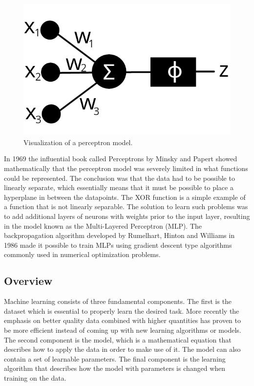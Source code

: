 \begin{figure}[H]
    \centering
    \includegraphics[width=0.8\linewidth]{Figures/Misc/Perceptron.png}
    \caption{Visualization of a perceptron model.}
    \label{fig:perceptron}
\end{figure}

In 1969 the influential book called Perceptrons by Minsky and Papert\cite{perceptronsbook} showed mathematically that the perceptron model was severely limited in what functions could be represented. The conclusion was that the data had to be possible to linearly separate, which essentially means that it must be possible to place a hyperplane in between the datapoints. The XOR function is a simple example of a function that is not linearly separable. The solution to learn such problems was to add additional layers of neurons with weights prior to the input layer, resulting in the model known as the Multi-Layered Perceptron (MLP). The backpropagation algorithm developed by Rumelhart, Hinton and Williams in 1986 \cite{backprop86} made it possible to train MLPs using gradient descent type algorithms commonly used in numerical optimization problems.

\subsection{Overview}

Machine learning consists of three fundamental components. The first is the dataset which is essential to properly learn the desired task. More recently the emphasis on better quality data combined with higher quantities has proven to be more efficient instead of coming up with new learning algorithms or models. The second component is the model, which is a mathematical equation that describes how to apply the data in order to make use of it. The model can also contain a set of learnable parameters. The final component is the learning algorithm that describes how the model with parameters is changed when training on the data.

